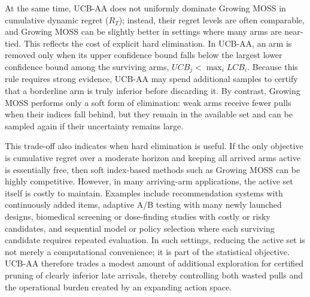 \documentclass[
  12pt]{article}
\begin{document}

At the same time, UCB-AA does not uniformly dominate Growing MOSS in cumulative dynamic regret
($R_T$); instead, their regret levels are often comparable, and Growing MOSS can be slightly
better in settings where many arms are near-tied. This reflects the cost of explicit hard
elimination. In UCB-AA, an arm is removed only when its upper confidence bound falls below
the largest lower confidence bound among the surviving arms,
\(
UCB_j < \max_i LCB_i.
\)
Because this rule requires strong evidence, UCB-AA may spend additional samples to certify that
a borderline arm is truly inferior before discarding it. By contrast, Growing MOSS performs only
a soft form of elimination: weak arms receive fewer pulls when their indices fall behind, but
they remain in the available set and can be sampled again if their uncertainty remains large.

This trade-off also indicates when hard elimination is useful. If the only objective is cumulative
regret over a moderate horizon and keeping all arrived arms active is essentially free, then soft
index-based methods such as Growing MOSS can be highly competitive. However, in many arriving-arm
applications, the active set itself is costly to maintain. Examples include recommendation systems
with continuously added items, adaptive A/B testing with many newly launched designs, biomedical
screening or dose-finding studies with costly or risky candidates, and sequential model or policy
selection where each surviving candidate requires repeated evaluation. In such settings, reducing
the active set is not merely a computational convenience; it is part of the statistical objective.
UCB-AA therefore trades a modest amount of additional exploration for certified pruning of clearly
inferior late arrivals, thereby controlling both wasted pulls and the operational burden created
by an expanding action space.
\end{document}
